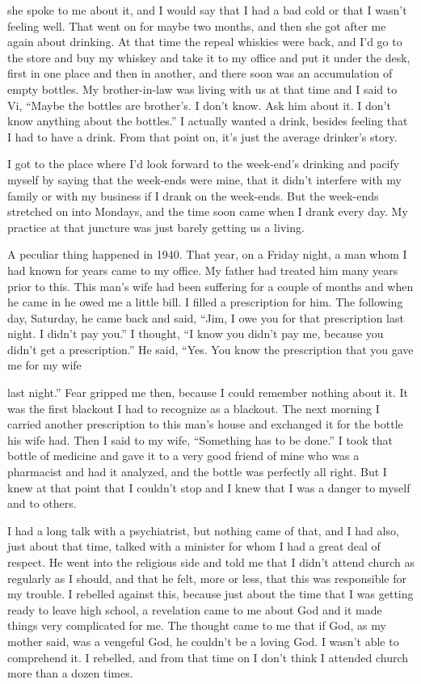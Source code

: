 she spoke to me about it, and I would say that I had a bad cold or that I wasn’t feeling well. That went on for maybe two months, and then she got after me again about drinking. At that time the repeal whiskies were back, and I’d go to the store and buy my whiskey and take it to my office and put it under the desk, first in one place and then in another, and there soon was an accumulation of empty bottles. My brother-in-law was living with us at that time and I said to Vi, “Maybe the bottles are brother’s. I don’t know. Ask him about it. I don’t know anything about the bottles.” I actually wanted a drink, besides feeling that I had to have a drink. From that point on, it’s just the average drinker’s story.

I got to the place where I’d look forward to the week-end’s drinking and pacify myself by saying that the week-ends were mine, that it didn’t interfere with my family or with my business if I drank on the week-ends. But the week-ends stretched on into Mondays, and the time soon came when I drank every day. My practice at that juncture was just barely getting us a living.

A peculiar thing happened in 1940. That year, on a Friday night, a man whom I had known for years came to my office. My father had treated him many years prior to this. This man’s wife had been suffering for a couple of months and when he came in he owed me a little bill. I filled a prescription for him. The following day, Saturday, he came back and said, “Jim, I owe you for that prescription last night. I didn’t pay you.” I thought, “I know you didn’t pay me, because you didn’t get a prescription.” He said, “Yes. You know the prescription that you gave me for my wife

last night.” Fear gripped me then, because I could remember nothing about it. It was the first blackout I had to recognize as a blackout. The next morning I carried another prescription to this man’s house and exchanged it for the bottle his wife had. Then I said to my wife, “Something has to be done.” I took that bottle of medicine and gave it to a very good friend of mine who was a pharmacist and had it analyzed, and the bottle was perfectly all right. But I knew at that point that I couldn’t stop and I knew that I was a danger to myself and to others.

I had a long talk with a psychiatrist, but nothing came of that, and I had also, just about that time, talked with a minister for whom I had a great deal of respect. He went into the religious side and told me that I didn’t attend church as regularly as I should, and that he felt, more or less, that this was responsible for my trouble. I rebelled against this, because just about the time that I was getting ready to leave high school, a revelation came to me about God and it made things very complicated for me. The thought came to me that if God, as my mother said, was a vengeful God, he couldn’t be a loving God. I wasn’t able to comprehend it. I rebelled, and from that time on I don’t think I attended church more than a dozen times.

